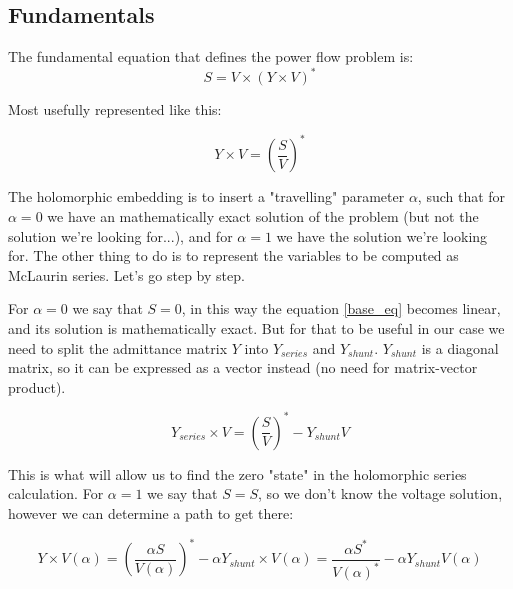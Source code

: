 \documentclass[nols,a4paper,twoside,symmetric,notoc,fleqn]{tufte-book}
\begin{document}
\subsection{Fundamentals} \label{helm_fundamentals}

The fundamental equation that defines the power flow problem is:
\begin{equation}
{S} = {V} \times ({Y} \times {V})^*
\end{equation}

Most usefully represented like this:


\begin{equation}
{{Y} \times {V}} = \left(\frac{{S}}{{V}}\right)^* 
\label{base_eq}
\end{equation}


The holomorphic embedding is to insert a "travelling" parameter $\alpha$, such that for $\alpha=0$ we have an mathematically exact solution of the problem (but not the solution we're looking for...), and for $\alpha=1$ we have the solution we're looking for. The other thing to do is to represent the variables to be computed as McLaurin series. Let's go step by step.\newline

For $\alpha=0$ we say that $S=0$, in this way the equation \ref{base_eq} becomes linear, and its solution is mathematically exact. But for that to be useful in our case we need to split the admittance matrix $Y$ into $Y_{series}$ and $Y_{shunt}$. $Y_{shunt}$ is a diagonal matrix, so it can be expressed as a vector instead (no need for matrix-vector product).

\begin{equation}
{Y}_{series} \times {V} = \left(\frac{{S}}{{V}}\right)^* - {Y}_{shunt} {V}
\label{base_eq_alpha_0}
\end{equation}

This is what will allow us to find the zero "state" in the holomorphic series calculation. For $\alpha=1$ we say that $S=S$, so we don't know the voltage solution, however we can determine a path to get there:

\begin{equation}
{    {Y }\times     {V}( \alpha )} = \left(\frac{ \alpha    {S}}{{V}( \alpha )}\right)^* - \alpha {Y}_{shunt} \times {V}( \alpha ) = \frac{ \alpha{S}^*}{{V}( \alpha )^*} - \alpha {Y}_{shunt} {V}( \alpha )
\label{base_eq_embedded}
\end{equation}
\end{document}
